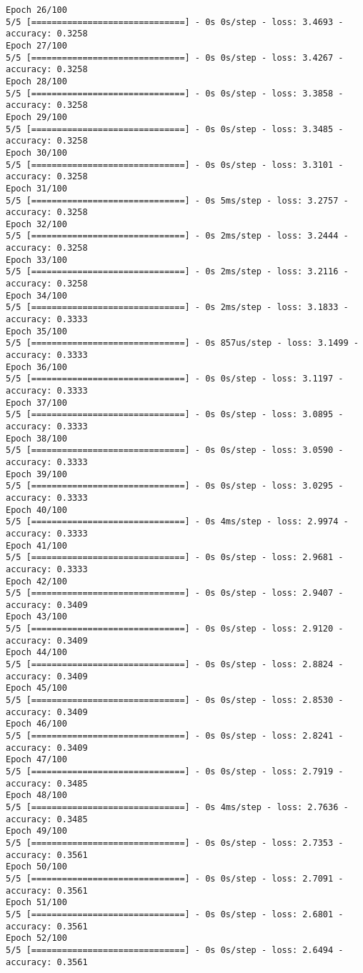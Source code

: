 \documentclass[12pt]{article}
\begin{document}
\begin{lstlisting}
Epoch 26/100
5/5 [==============================] - 0s 0s/step - loss: 3.4693 - accuracy: 0.3258
Epoch 27/100
5/5 [==============================] - 0s 0s/step - loss: 3.4267 - accuracy: 0.3258
Epoch 28/100
5/5 [==============================] - 0s 0s/step - loss: 3.3858 - accuracy: 0.3258
Epoch 29/100
5/5 [==============================] - 0s 0s/step - loss: 3.3485 - accuracy: 0.3258
Epoch 30/100
5/5 [==============================] - 0s 0s/step - loss: 3.3101 - accuracy: 0.3258
Epoch 31/100
5/5 [==============================] - 0s 5ms/step - loss: 3.2757 - accuracy: 0.3258
Epoch 32/100
5/5 [==============================] - 0s 2ms/step - loss: 3.2444 - accuracy: 0.3258
Epoch 33/100
5/5 [==============================] - 0s 2ms/step - loss: 3.2116 - accuracy: 0.3258
Epoch 34/100
5/5 [==============================] - 0s 2ms/step - loss: 3.1833 - accuracy: 0.3333
Epoch 35/100
5/5 [==============================] - 0s 857us/step - loss: 3.1499 - accuracy: 0.3333
Epoch 36/100
5/5 [==============================] - 0s 0s/step - loss: 3.1197 - accuracy: 0.3333
Epoch 37/100
5/5 [==============================] - 0s 0s/step - loss: 3.0895 - accuracy: 0.3333
Epoch 38/100
5/5 [==============================] - 0s 0s/step - loss: 3.0590 - accuracy: 0.3333
Epoch 39/100
5/5 [==============================] - 0s 0s/step - loss: 3.0295 - accuracy: 0.3333
Epoch 40/100
5/5 [==============================] - 0s 4ms/step - loss: 2.9974 - accuracy: 0.3333
Epoch 41/100
5/5 [==============================] - 0s 0s/step - loss: 2.9681 - accuracy: 0.3333
Epoch 42/100
5/5 [==============================] - 0s 0s/step - loss: 2.9407 - accuracy: 0.3409
Epoch 43/100
5/5 [==============================] - 0s 0s/step - loss: 2.9120 - accuracy: 0.3409
Epoch 44/100
5/5 [==============================] - 0s 0s/step - loss: 2.8824 - accuracy: 0.3409
Epoch 45/100
5/5 [==============================] - 0s 0s/step - loss: 2.8530 - accuracy: 0.3409
Epoch 46/100
5/5 [==============================] - 0s 0s/step - loss: 2.8241 - accuracy: 0.3409
Epoch 47/100
5/5 [==============================] - 0s 0s/step - loss: 2.7919 - accuracy: 0.3485
Epoch 48/100
5/5 [==============================] - 0s 4ms/step - loss: 2.7636 - accuracy: 0.3485
Epoch 49/100
5/5 [==============================] - 0s 0s/step - loss: 2.7353 - accuracy: 0.3561
Epoch 50/100
5/5 [==============================] - 0s 0s/step - loss: 2.7091 - accuracy: 0.3561
Epoch 51/100
5/5 [==============================] - 0s 0s/step - loss: 2.6801 - accuracy: 0.3561
Epoch 52/100
5/5 [==============================] - 0s 0s/step - loss: 2.6494 - accuracy: 0.3561

\end{lstlisting}
\end{document}
